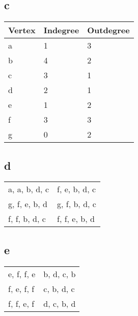 \documentclass[11pt]{article}
\begin{document}
\subsection*{c}
\begin{table}[H]
    \centering
    \begin{tabular}{|l|l|l|}
    \hline
    \textbf{Vertex} & \textbf{Indegree} & \textbf{Outdegree} \\ \hline
    a                                & 1                                  & 3                                   \\
    b                                & 4                                  & 2                                   \\
    c                                & 3                                  & 1                                   \\
    d                                & 2                                  & 1                                   \\
    e                                & 1                                  & 2                                   \\
    f                                & 3                                  & 3                                   \\
    g                                & 0                                  & 2                                   \\ \hline
    \end{tabular}
\end{table}
\subsection*{d}
\begin{table}[H]
    \centering
    \begin{tabular}{ll}
    a, a, b, d, c & f, e, b, d, c \\
    g, f, e, b, d & g, f, b, d, c \\
    f, f, b, d, c & f, f, e, b, d
    \end{tabular}
\end{table}
\subsection*{e}
\begin{table}[H]
    \centering
    \begin{tabular}{ll}
    e, f, f, e & b, d, c, b \\
    f, e, f, f & c, b, d, c \\
    f, f, e, f & d, c, b, d
    \end{tabular}
\end{table}
\end{document}
